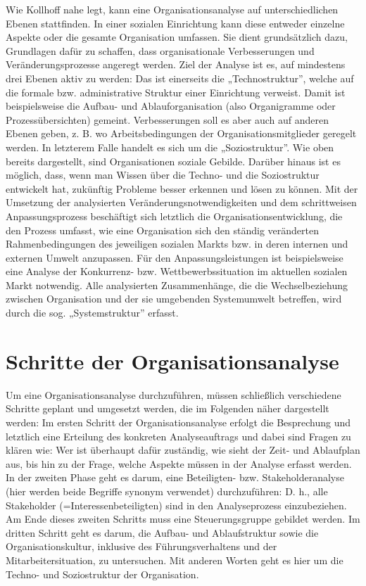 \documentclass[
  letterpaper,
]{book}
\begin{document}
Wie Kollhoff nahe legt, kann eine Organisationsanalyse auf
unterschiedlichen Ebenen stattfinden. In einer sozialen Einrichtung kann
diese entweder einzelne Aspekte oder die gesamte Organisation umfassen.
Sie dient grundsätzlich dazu, Grundlagen dafür zu schaffen, dass
organisationale Verbesserungen und Veränderungsprozesse angeregt werden.
Ziel der Analyse ist es, auf mindestens drei Ebenen aktiv zu werden: Das
ist einerseits die „Technostruktur'', welche auf die formale bzw.
administrative Struktur einer Einrichtung verweist. Damit ist
beispielsweise die Aufbau- und Ablauforganisation (also Organigramme
oder Prozessübersichten) gemeint. Verbesserungen soll es aber auch auf
anderen Ebenen geben, z. B. wo Arbeitsbedingungen der
Organisationsmitglieder geregelt werden. In letzterem Falle handelt es
sich um die „Soziostruktur''. Wie oben bereits dargestellt, sind
Organisationen soziale Gebilde. Darüber hinaus ist es möglich, dass,
wenn man Wissen über die Techno- und die Soziostruktur entwickelt hat,
zukünftig Probleme besser erkennen und lösen zu können. Mit der
Umsetzung der analysierten Veränderungsnotwendigkeiten und dem
schrittweisen Anpassungsprozess beschäftigt sich letztlich die
Organisationsentwicklung, die den Prozess umfasst, wie eine Organisation
sich den ständig veränderten Rahmenbedingungen des jeweiligen sozialen
Markts bzw. in deren internen und externen Umwelt anzupassen. Für den
Anpassungsleistungen ist beispielsweise eine Analyse der Konkurrenz-
bzw. Wettbewerbssituation im aktuellen sozialen Markt notwendig. Alle
analysierten Zusammenhänge, die die Wechselbeziehung zwischen
Organisation und der sie umgebenden Systemumwelt betreffen, wird durch
die sog. „Systemstruktur'' erfasst.

\section{Schritte der
Organisationsanalyse}\label{schritte-der-organisationsanalyse}

Um eine Organisationsanalyse durchzuführen, müssen schließlich
verschiedene Schritte geplant und umgesetzt werden, die im Folgenden
näher dargestellt werden: Im ersten Schritt der Organisationsanalyse
erfolgt die Besprechung und letztlich eine Erteilung des konkreten
Analyseauftrags und dabei sind Fragen zu klären wie: Wer ist überhaupt
dafür zuständig, wie sieht der Zeit- und Ablaufplan aus, bis hin zu der
Frage, welche Aspekte müssen in der Analyse erfasst werden. In der
zweiten Phase geht es darum, eine Beteiligten- bzw. Stakeholderanalyse
(hier werden beide Begriffe synonym verwendet) durchzuführen: D. h.,
alle Stakeholder (=Interessenbeteiligten) sind in den Analyseprozess
einzubeziehen. Am Ende dieses zweiten Schritts muss eine
Steuerungsgruppe gebildet werden. Im dritten Schritt geht es darum, die
Aufbau- und Ablaufstruktur sowie die Organisationskultur, inklusive des
Führungsverhaltens und der Mitarbeitersituation, zu untersuchen. Mit
anderen Worten geht es hier um die Techno- und Soziostruktur der
Organisation.
\end{document}

